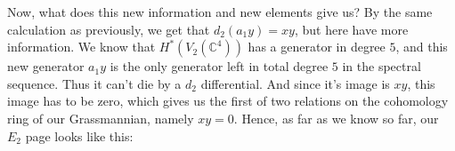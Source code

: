 
Now, what does this new information and new elements give us? 
By the same calculation as previously, we get that $d_2(a_1y) = xy$, 
but here have more information. 
We know that $H^*(V_2(\mathbb{C}^4))$ has a generator in degree $5$, 
and this new generator $a_1y$ is the only generator left in total degree $5$ in the spectral sequence. 
Thus it can't die by a $d_2$ differential. 
And since it's image is $xy$, this image has to be zero, which gives us the first of two relations on the cohomology ring of our Grassmannian, namely $xy=0$. 
Hence, as far as we know so far, our $E_2$ page looks like this: 

